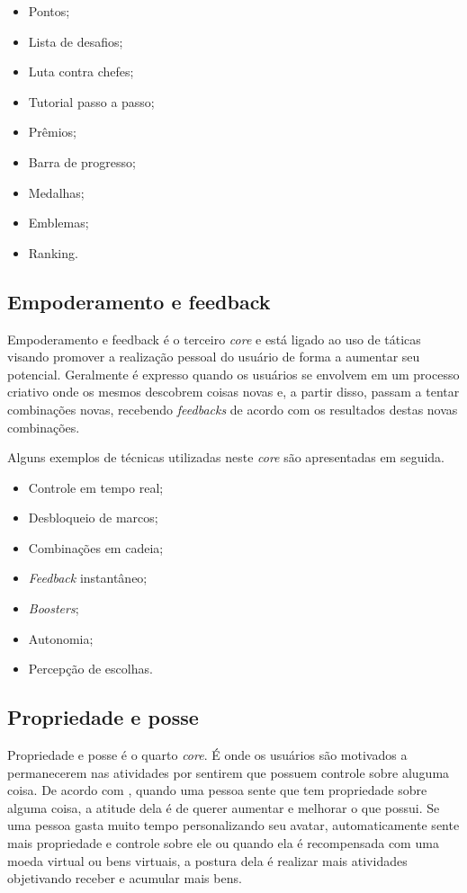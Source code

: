 \begin{itemize}
	\item Pontos;
	\item Lista de desafios;
	\item Luta contra chefes;
	\item Tutorial passo a passo;
	\item Prêmios;
	\item Barra de progresso;
	\item Medalhas;
	\item Emblemas;
	\item Ranking.
\end{itemize}


\subsection{Empoderamento e feedback}
Empoderamento e feedback é o terceiro \textit{core} e está ligado ao uso de táticas visando promover a realização pessoal
do usuário de forma a aumentar seu potencial. Geralmente é expresso quando os usuários se envolvem em um processo criativo
onde os mesmos descobrem coisas novas e, a partir disso, passam a tentar combinações novas, recebendo \textit{feedbacks}
de acordo com os resultados destas novas combinações.

Alguns exemplos de técnicas utilizadas neste \textit{core} são apresentadas em seguida.

\begin{itemize}
	\item Controle em tempo real;
	\item Desbloqueio de marcos;
	\item Combinações em cadeia;
	\item \textit{Feedback} instantâneo;
	\item \textit{Boosters};
	\item Autonomia;
	\item Percepção de escolhas.
\end{itemize}



\subsection{Propriedade e posse}
Propriedade e posse é o quarto \textit{core}. É onde os usuários são motivados a permanecerem nas atividades por
sentirem que possuem controle sobre aluguma coisa. De acordo com , quando uma pessoa
sente que tem propriedade sobre alguma coisa, a atitude dela é de querer aumentar e melhorar o que possui. Se uma pessoa
gasta muito tempo personalizando seu avatar, automaticamente sente mais propriedade e controle sobre ele ou quando ela é
recompensada com uma moeda virtual ou bens virtuais, a postura dela é realizar mais atividades objetivando receber
e acumular mais bens.

